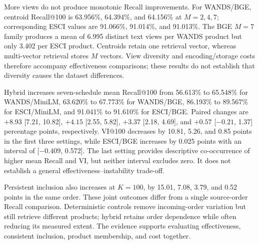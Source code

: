 

More views do not produce monotonic Recall improvements. For WANDS/\allowbreak BGE, centroid Recall@100 is 63.956\%, 64.394\%, and 64.156\% at $M=2,4,7$; corresponding ESCI values are 91.066\%, 91.014\%, and 91.013\%. The BGE $M=7$ family produces a mean of 6.995 distinct text views per WANDS product but only 3.402 per ESCI product. Centroids retain one retrieval vector, whereas multi-vector retrieval stores $M$ vectors. View diversity and encoding/storage costs therefore accompany effectiveness comparisons; these results do not establish that diversity causes the dataset differences.

Hybrid increases seven-schedule mean Recall@100 from 56.613\% to 65.548\% for WANDS/\allowbreak MiniLM, 63.620\% to 67.773\% for WANDS/\allowbreak BGE, 86.193\% to 89.567\% for ESCI/\allowbreak MiniLM, and 91.041\% to 91.610\% for ESCI/\allowbreak BGE. Paired changes are $+8.93$ [7.21, 10.82], $+4.15$ [2.55, 5.82], $+3.37$ [2.18, 4.69], and $+0.57$ [$-0.21$, 1.37] percentage points, respectively. VI@100 decreases by 10.81, 5.26, and 0.85 points in the first three settings, while ESCI/\allowbreak BGE increases by 0.025 points with an interval of [$-0.409$, 0.572]. The last setting provides descriptive co-occurrence of higher mean Recall and VI, but neither interval excludes zero. It does not establish a general effectiveness--instability trade-off.

Persistent inclusion also increases at $K=100$, by 15.01, 7.08, 3.79, and 0.52 points in the same order. These joint outcomes differ from a single source-order Recall comparison. Deterministic controls remove incoming-order variation but still retrieve different products; hybrid retains order dependence while often reducing its measured extent. The evidence supports evaluating effectiveness, consistent inclusion, product membership, and cost together.

